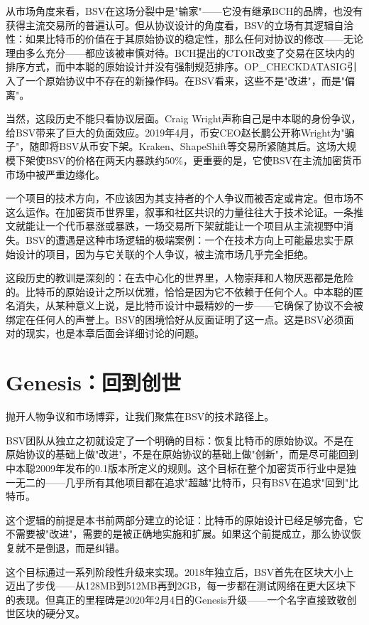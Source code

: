 \documentclass[a4paper,12pt,openany]{ctexbook}
\begin{document}
从市场角度来看，BSV在这场分裂中是"输家"——它没有继承BCH的品牌，也没有获得主流交易所的普遍认可。但从协议设计的角度看，BSV的立场有其逻辑自洽性：如果比特币的价值在于其原始协议的稳定性，那么任何对协议的修改——无论理由多么充分——都应该被审慎对待。BCH提出的CTOR改变了交易在区块内的排序方式，而中本聪的原始设计并没有强制规范排序。OP\_CHECKDATASIG引入了一个原始协议中不存在的新操作码。在BSV看来，这些不是"改进"，而是"偏离"。

当然，这段历史不能只看协议层面。Craig Wright声称自己是中本聪的身份争议，给BSV带来了巨大的负面效应。2019年4月，币安CEO赵长鹏公开称Wright为"骗子"，随即将BSV从币安下架。Kraken、ShapeShift等交易所紧随其后。这场大规模下架使BSV的价格在两天内暴跌约50\%，更重要的是，它使BSV在主流加密货币市场中被严重边缘化。

一个项目的技术方向，不应该因为其支持者的个人争议而被否定或肯定。但市场不这么运作。在加密货币世界里，叙事和社区共识的力量往往大于技术论证。一条推文就能让一个代币暴涨或暴跌，一场交易所下架就能让一个项目从主流视野中消失。BSV的遭遇是这种市场逻辑的极端案例：一个在技术方向上可能最忠实于原始设计的项目，因为与它关联的个人争议，被主流市场几乎完全拒绝。

这段历史的教训是深刻的：在去中心化的世界里，人物崇拜和人物厌恶都是危险的。比特币的原始设计之所以优雅，恰恰是因为它不依赖于任何个人。中本聪的匿名消失，从某种意义上说，是比特币设计中最精妙的一步——它确保了协议不会被绑定在任何人的声誉上。BSV的困境恰好从反面证明了这一点。这是BSV必须面对的现实，也是本章后面会详细讨论的问题。


\section*{Genesis：回到创世}


抛开人物争议和市场博弈，让我们聚焦在BSV的技术路径上。

BSV团队从独立之初就设定了一个明确的目标：恢复比特币的原始协议。不是在原始协议的基础上做"改进"，不是在原始协议的基础上做"创新"，而是尽可能回到中本聪2009年发布的0.1版本所定义的规则。这个目标在整个加密货币行业中是独一无二的——几乎所有其他项目都在追求"超越"比特币，只有BSV在追求"回到"比特币。

这个逻辑的前提是本书前两部分建立的论证：比特币的原始设计已经足够完备，它不需要被"改进"，需要的是被正确地实施和扩展。如果这个前提成立，那么协议恢复就不是倒退，而是纠错。

这个目标通过一系列阶段性升级来实现。2018年独立后，BSV首先在区块大小上迈出了步伐——从128MB到512MB再到2GB，每一步都在测试网络在更大区块下的表现。但真正的里程碑是2020年2月4日的Genesis升级——一个名字直接致敬创世区块的硬分叉。
\end{document}
